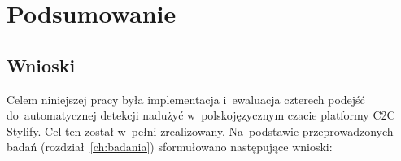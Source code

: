\chapter{Podsumowanie}
\label{ch:podsumowanie}

\section{Wnioski}
\label{sec:wnioski}

Celem niniejszej pracy była implementacja i~ewaluacja czterech podejść
do~automatycznej detekcji nadużyć w~polskojęzycznym czacie platformy C2C
Stylify. Cel ten został w~pełni zrealizowany. Na~podstawie przeprowadzonych
badań (rozdział~\ref{ch:badania}) sformułowano następujące wnioski:

